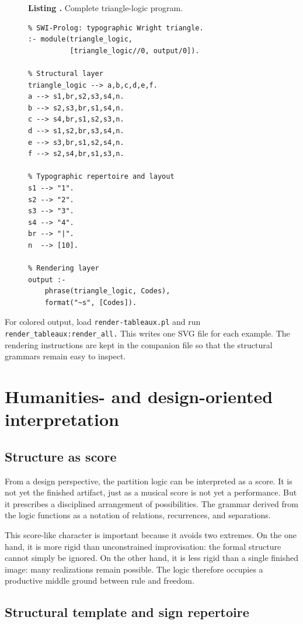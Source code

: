 \documentclass[
  10pt,
  twocolumn,
  aps,
  pra,
  showkeys,
  amsmath,amssymb,
  longbibliography
]{revtex4-2}
\newcounter{listing}
\renewcommand{\thelisting}{\arabic{listing}}
\newcommand{\listingtitle}[2]{%
  \refstepcounter{listing}%
  \par\smallskip
  \noindent\textbf{Listing \thelisting.} #2%
  \label{#1}%
  \par\smallskip
}
\begin{document}
\begin{figure}[tbp]
\listingtitle{lst:trianglecode}{Complete triangle-logic program.}
\begin{lstlisting}
% SWI-Prolog: typographic Wright triangle.
:- module(triangle_logic,
          [triangle_logic//0, output/0]).

% Structural layer
triangle_logic --> a,b,c,d,e,f.
a --> s1,br,s2,s3,s4,n.
b --> s2,s3,br,s1,s4,n.
c --> s4,br,s1,s2,s3,n.
d --> s1,s2,br,s3,s4,n.
e --> s3,br,s1,s2,s4,n.
f --> s2,s4,br,s1,s3,n.

% Typographic repertoire and layout
s1 --> "1".
s2 --> "2".
s3 --> "3".
s4 --> "4".
br --> "|".
n  --> [10].

% Rendering layer
output :-
    phrase(triangle_logic, Codes),
    format("~s", [Codes]).
\end{lstlisting}
\end{figure}

For colored output, load \texttt{render-tableaux.pl} and run \texttt{render\_tableaux:render\_all.} This writes one SVG file for each example. The rendering instructions are kept in the companion file so that the structural grammars remain easy to inspect.

\section{Humanities- and design-oriented interpretation}

\subsection{Structure as score}

From a design perspective, the partition logic can be interpreted as a score. It is not yet the finished artifact, just as a musical score is not yet a performance. But it prescribes a disciplined arrangement of possibilities. The grammar derived from the logic functions as a notation of relations, recurrences, and separations.

This score-like character is important because it avoids two extremes. On the one hand, it is more rigid than unconstrained improvisation: the formal structure cannot simply be ignored. On the other hand, it is less rigid than a single finished image: many realizations remain possible. The logic therefore occupies a productive middle ground between rule and freedom.

\subsection{Structural template and sign repertoire}
\end{document}
